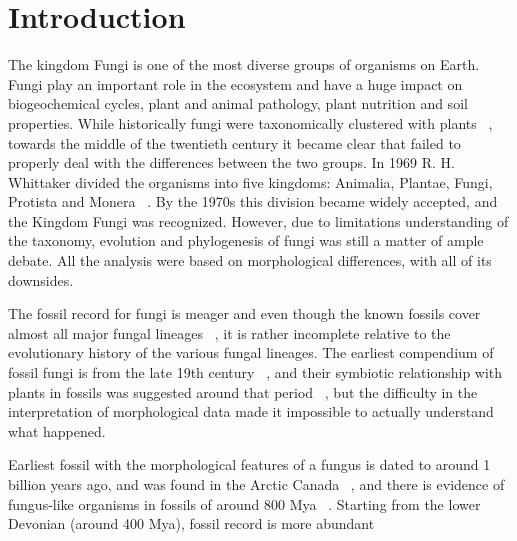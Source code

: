 \def\bibliocommand{}


\part{Introduction}
\label{introduction}

The kingdom Fungi is one of the most diverse groups of organisms on Earth. Fungi play an important role in the ecosystem and have a huge impact on biogeochemical cycles, plant and animal pathology, plant nutrition and soil properties.
While historically fungi were taxonomically clustered with plants ~\citep{copeland1938, copeland1956}, towards the middle of the twentieth century it became clear that failed to properly deal with the differences between the two groups. In 1969 R. H. Whittaker divided the organisms into five kingdoms: Animalia, Plantae, Fungi, Protista and Monera ~\citep{whittaker1969}. By the 1970s this division became widely accepted, and the Kingdom Fungi was recognized.
However, due to limitations understanding of the taxonomy, evolution and phylogenesis of fungi was still a matter of ample debate. All the analysis were based on morphological differences, with all of its downsides.

The fossil record for fungi is meager and even though the known fossils cover almost all major fungal lineages ~\citep{lucking2009}, it is rather incomplete relative to the evolutionary history of the various fungal lineages. The earliest compendium of fossil fungi is from the late 19th century ~\citep{meschinelli1898}, and their symbiotic relationship with plants in fossils was suggested around that period ~\citep{renault1896}, but the difficulty in the interpretation of morphological data made it impossible to actually understand what happened.

Earliest fossil with the morphological features of a fungus is dated to around 1 billion years ago, and was found in the Arctic Canada ~\citep{loron2019}, and there is evidence of fungus-like organisms in fossils of around 800 Mya ~\citep{bonneville2020}.
Starting from the lower Devonian (around 400 Mya), fossil record is more abundant ~\citep{lucking2009}

